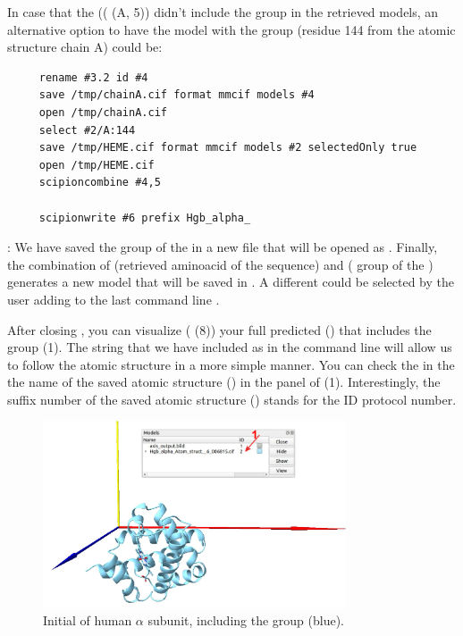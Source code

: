 In case that the   (( (A, 5)) didn't include the  group in the retrieved models, an alternative option to have the model with the  group (residue 144 from the atomic structure  chain A) could be:
\begin{verbatim}
     rename #3.2 id #4
     save /tmp/chainA.cif format mmcif models #4
     open /tmp/chainA.cif
     select #2/A:144
     save /tmp/HEME.cif format mmcif models #2 selectedOnly true 
     open /tmp/HEME.cif
     scipioncombine #4,5

     scipionwrite #6 prefix Hgb_alpha_
 \end{verbatim}
 
 : We have saved the  group of the   in a new file that will be opened as  . Finally, the combination of   (retrieved aminoacid  of the  sequence) and  ( group of the  ) generates a new model  that will be saved in \scipion. A different  could be selected by the user adding to the last command line .


After closing \chimera, you can visualize ( (8)) your full predicted  () that includes the  group (1).  The string that we have included as  in the command line  will allow us to follow the atomic structure in a more simple manner. You can check the  in the the name of the saved atomic structure () in the  panel of  (1). Interestingly, the suffix number of the saved atomic structure () stands for the ID protocol number.
 
 \begin{figure}[H]
  \centering 
  \captionsetup{width=.9\linewidth} 
  \includegraphics[width=0.80\textwidth]{Images/Fig16}
  \caption{Initial  of human  $\alpha$ subunit, including the  group (blue).}
  \label{fig:chimera_model}
  \end{figure}
  
